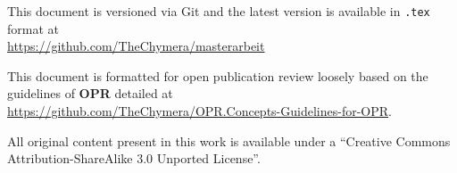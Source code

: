 
\footnotesize


\large

\clearpage{}
\null
\vfill
\footnotesize
\begin{center}
    \footnotesize\textcolor{mg}{This document is versioned via Git and the latest version is available in \colorbox{vlg}{\texttt{.tex}} format at\\ \url{https://github.com/TheChymera/masterarbeit}}
    
    \footnotesize\textcolor{mg}{This document is formatted for open publication review loosely based on the guidelines of \textbf{OPR} detailed at\\ \url{https://github.com/TheChymera/OPR.Concepts-Guidelines-for-OPR}}.

    \footnotesize\textcolor{mg}{All original content present in this work is available under a “Creative Commons Attribution-ShareAlike 3.0 Unported License”.}
\end{center}

